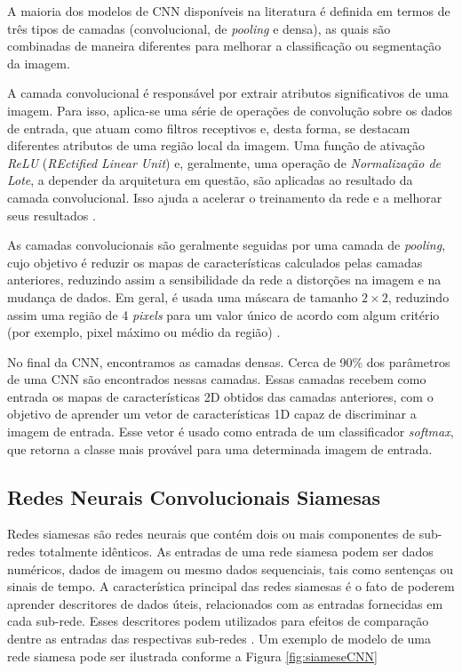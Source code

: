 \documentclass[12pt]{article}
\begin{document}
A maioria dos modelos de CNN disponíveis na literatura é definida em termos de três tipos de camadas (convolucional, de \textit{pooling} e densa), as quais são combinadas de maneira diferentes para melhorar a classificação ou segmentação da imagem.

A camada convolucional é responsável por extrair atributos significativos de uma imagem. Para isso, aplica-se uma série de operações de convolução sobre os dados de entrada, que atuam como filtros receptivos e, desta forma, se destacam diferentes atributos de uma região local da imagem. Uma função de ativação \textit{ReLU} (\textit{REctified Linear Unit}) e, geralmente, uma operação de \textit{Normalização de Lote}, a depender da arquitetura em questão, são aplicadas ao resultado da camada convolucional. Isso ajuda a acelerar o treinamento da rede e a melhorar seus resultados \cite{LeCun2015}.

As camadas convolucionais são geralmente seguidas por uma camada de \textit{pooling}, cujo objetivo é reduzir os mapas de características calculados pelas camadas anteriores, reduzindo assim a sensibilidade da rede a distorções na imagem e na mudança de dados. Em geral, é usada uma máscara de tamanho $2 \times 2$, reduzindo assim uma região de 4 \textit{pixels} para um valor único de acordo com algum critério (por exemplo, pixel máximo ou médio da região) \cite{Scherer2010}.

No final da CNN, encontramos as camadas densas. Cerca de 90\% dos parâmetros de uma CNN são encontrados nessas camadas. Essas camadas recebem como entrada os mapas de características 2D obtidos das camadas anteriores, com o objetivo de aprender um vetor de características 1D capaz de discriminar a imagem de entrada. Esse vetor é usado como entrada de um classificador \textit{softmax}, que retorna a classe mais provável para uma determinada imagem de entrada.

\subsection{Redes Neurais Convolucionais Siamesas}

Redes siamesas são redes neurais que contém dois ou mais componentes de sub-redes totalmente idênticos. As entradas de uma rede siamesa podem ser dados numéricos, dados de imagem ou mesmo dados sequenciais, tais como sentenças ou sinais de tempo. A característica principal das redes siamesas é o fato de poderem aprender descritores de dados úteis, relacionados com as entradas fornecidas em cada sub-rede. Esses descritores podem utilizados para efeitos de comparação dentre as entradas das respectivas sub-redes \cite{bromley1994signature}. Um exemplo de modelo de uma rede siamesa pode ser ilustrada conforme a Figura \ref{fig:siameseCNN}
\end{document}
